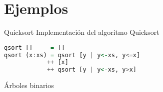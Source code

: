 \section{Ejemplos}

\begin{frame}[fragile]{Quicksort}
  Implementación del algoritmo Quicksort
  \begin{lstlisting}[language=haskell]
qsort []     = []
qsort (x:xs) = qsort [y | y<-xs, y<=x]
            ++ [x]
            ++ qsort [y | y<-xs, y>x]
  \end{lstlisting}
\end{frame}

\begin{frame}[fragile]{Árboles binarios}
\end{frame}
